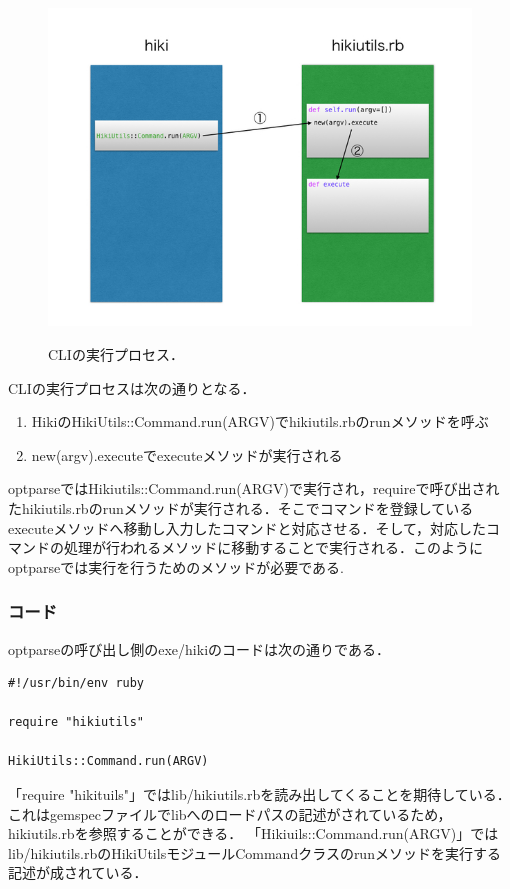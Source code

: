 \begin{figure}[htbp]\begin{center}
\includegraphics[width=12cm,bb= 0 0 737 553]{../figs/./hikiutils_yamane.007.jpg}
\caption{CLIの実行プロセス．}
\label{fig:007}
\label{default}\end{center}\end{figure}
CLIの実行プロセスは次の通りとなる．

\begin{enumerate}
\item HikiのHikiUtils::Command.run(ARGV)でhikiutils.rbのrunメソッドを呼ぶ
\item new(argv).executeでexecuteメソッドが実行される
\end{enumerate}
optparseではHikiutils::Command.run(ARGV)で実行され，requireで呼び出されたhikiutils.rbのrunメソッドが実行される．そこでコマンドを登録しているexecuteメソッドへ移動し入力したコマンドと対応させる．そして，対応したコマンドの処理が行われるメソッドに移動することで実行される．このようにoptparseでは実行を行うためのメソッドが必要である.

\subsubsection{コード}
optparseの呼び出し側のexe/hikiのコードは次の通りである．
\begin{lstlisting}[style=customRuby,basicstyle={\scriptsize\ttfamily}]
#!/usr/bin/env ruby                                                             

require "hikiutils"

HikiUtils::Command.run(ARGV)
\end{lstlisting}
「require "hikituils"」ではlib/hikiutils.rbを読み出してくることを期待している．
これはgemspecファイルでlibへのロードパスの記述がされているため，hikiutils.rbを参照することができる．
「Hikiuils::Command.run(ARGV)」ではlib/hikiutils.rbのHikiUtilsモジュールCommandクラスのrunメソッドを実行する記述が成されている．

